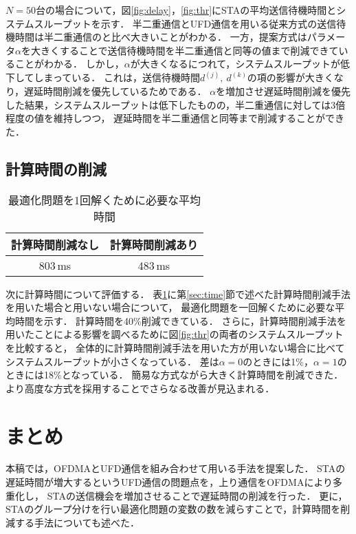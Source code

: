 \documentclass[technicalreport]{ieicej}
\begin{document}
		$N=50$台の場合について，図\ref{fig:delay}，\ref{fig:thr}にSTAの平均送信待機時間とシステムスループットを示す．
		半二重通信とUFD通信を用いる従来方式の送信待機時間は半二重通信のと比べ大きいことがわかる．
		一方，提案方式はパラメータ$\alpha$を大きくすることで送信待機時間を半二重通信と同等の値まで削減できていることがわかる．
		しかし，$\alpha$が大きくなるにつれて，システムスループットが低下してしまっている．
		これは，送信待機時間$d^{(j)},\ d^{(k)}$の項の影響が大きくなり，遅延時間削減を優先しているためである．
		$\alpha$を増加させ遅延時間削減を優先した結果，システムスループットは低下したものの，半二重通信に対しては3倍程度の値を維持しつつ，
		遅延時間を半二重通信と同等まで削減することができた．

	\subsection{計算時間の削減}
		\begin{table}[t]
			\centering
			\caption{最適化問題を1回解くために必要な平均時間}
			\label{tab:time}
			\begin{tabular}{cc}
			 計算時間削減なし & 計算時間削減あり\\ \hline
			 803\,ms & 483\,ms \\\hline
			\end{tabular}
		\end{table}

	次に計算時間について評価する．
	表\ref{tab:time}に第\ref{sec:time}節で述べた計算時間削減手法を用いた場合と用いない場合について，
	最適化問題を一回解くために必要な平均時間を示す．
	計算時間を40\%削減できている．
	さらに，計算時間削減手法を用いたことによる影響を調べるために図\ref{fig:thr}の両者のシステムスループットを比較すると，
	全体的に計算時間削減手法を用いた方が用いない場合に比べてシステムスループットが小さくなっている．
	差は$\alpha=0$のときには1\%，$\alpha=1$のときには18\%となっている．
	簡易な方式ながら大きく計算時間を削減できた．
	より高度な方式を採用することでさらなる改善が見込まれる．

\section{まとめ}
	本稿では，OFDMAとUFD通信を組み合わせて用いる手法を提案した．
	STAの遅延時間が増大するというUFD通信の問題点を，上り通信をOFDMAにより多重化し，
	STAの送信機会を増加させることで遅延時間の削減を行った．
	更に，STAのグループ分けを行い最適化問題の変数の数を減らすことで，計算時間を削減する手法についても述べた．



\end{document}
